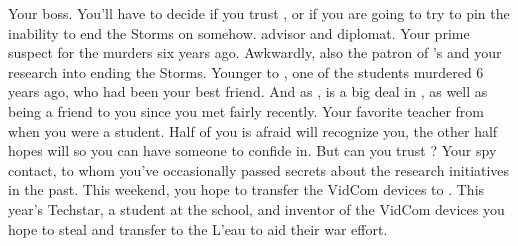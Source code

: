 \documentclass[char]{GL2020}
\begin{document}
\begin{contacts}
	\contact{\cHeadScientist{}} Your boss. You'll have to decide if you trust \cHeadScientist{}, or if you are going to try to pin the inability to end the Storms on \cHeadScientist{\them} somehow.
	\contact{\cDiplomat{}} \pTech{} advisor and diplomat. Your prime suspect for the murders six years ago. Awkwardly, also the patron of \cHeadScientist{}'s and your research into ending the Storms.
	\contact{\cHeir{}} Younger \cHeir{\sibling} to \cHeirSibling{}, one of the students murdered 6 years ago, who had been your best friend. And as \cHeir{\formal}, \cHeir{} is a big deal in \pTech{}, as well as being a friend to you since you met fairly recently.
	\contact{\cMusic{}} Your favorite teacher from when you were a student. Half of you is afraid \cMusic{\they} will recognize you, the other half hopes \cMusic{\they} will so you can have someone to confide in. But can you trust \cMusic{\them}?
	\contact{\cBunker{}} Your \pShip{} spy contact, to whom you've occasionally passed secrets about the \pTech{} research initiatives in the past. This weekend, you hope to transfer the VidCom devices to \cBunker{}.
	\contact{\cTechStar{}} This year's Techstar, a student at the school, and inventor of the VidCom devices you hope to steal and transfer to the L'eau to aid their war effort.
\end{contacts}
\end{document}
